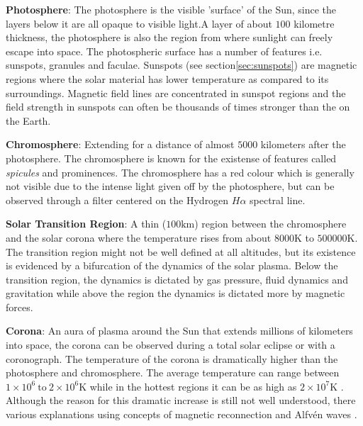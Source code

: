 \textbf{Photosphere}: The photosphere is the visible 'surface' of the Sun, since the layers below it are all opaque to 
visible light.A layer of about $100$ kilometre thickness, the photosphere is also the region from where sunlight can freely 
escape into space. The photospheric surface has a number of features i.e. sunspots, granules and faculae. 
Sunspots (see section\ref{sec:sunspots}) are magnetic regions where the solar material has lower temperature as compared 
to its surroundings. Magnetic field lines are concentrated in sunspot regions and the field strength in sunspots can often 
be thousands of times stronger than the on the Earth.



\textbf{Chromosphere}: Extending for a distance of almost $5000$ kilometers after the photosphere. The chromosphere is 
known for the existense of features called \emph{spicules} and prominences. The chromosphere has a red colour which 
is generally not visible due to the intense light given off by the photosphere, but can be observed through 
a filter centered on the Hydrogen $H\alpha$ spectral line. %

\textbf{Solar Transition Region}: A thin ($100 \text{km}$) region between the chromosphere and the solar corona 
where the temperature rises from about $8000 \text{K}$ to $500000 \text{K}$. The transition region might not be well 
defined at all altitudes, but its existence is evidenced by a bifurcation of the dynamics of the solar plasma. 
Below the transition region, the dynamics is dictated by gas pressure, fluid dynamics and gravitation while 
above the region the dynamics is dictated more by magnetic forces.

\textbf{Corona}: An aura of plasma around the Sun that extends millions of kilometers into space, the corona can be 
observed during a total solar eclipse or with a coronograph. The temperature of the corona is dramatically higher 
than the photosphere and chromosphere. The average temperature can range between 
$1 \times 10^6 \ \text{to} \ 2 \times 10^6 \text{K}$ while in the hottest regions it can be as high as 
$2 \times 10^7 \text{K}$ \citep{SolarCorona}. Although the reason for this dramatic increase is still 
not well understood, there various explanations using concepts of magnetic reconnection 
\citep{russell2001solar,SolarCorona} and Alfv\'en waves \citep{AlfvenCorona}.


